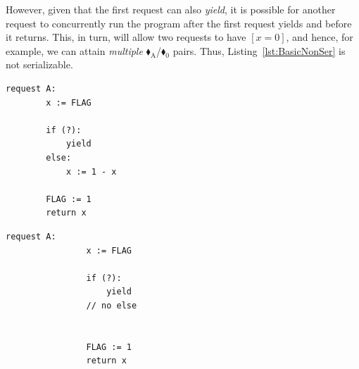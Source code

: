 %
%
%
%
%
%
%
%
However, given that the first request can also \textit{yield}, it is possible for another request to concurrently run the program after the first request yields and before it returns. This, in turn, will allow two requests to have $[x=0]$, and hence, for example, we can attain \textit{multiple} {\color{ForestGreen}$\blacklozenge_\text{A}$}/{\color{red}$\blacklozenge_0$} pairs. Thus, Listing~\ref{lst:BasicNonSer} is not serializable.
%
%
%
%
%




\noindent
\begin{minipage}[t]{0.45\textwidth}
	\begin{lstlisting}[caption={Serializable},
		label={lst:BasicSer}]
	request A: 
		x := FLAG
		
		if (?):
			yield
		else:
			x := 1 - x
		
		FLAG := 1
		return x
	\end{lstlisting}
\end{minipage}
\hfill
\begin{minipage}[t]{0.45\textwidth}
	\begin{lstlisting}[caption={Not serializable},
	label={lst:BasicNonSer}]
			request A: 
			    x := FLAG 
			
			    if (?): 
			        yield
			    // no else
			
			
			    FLAG := 1 
			    return x
		\end{lstlisting}
\end{minipage}%

